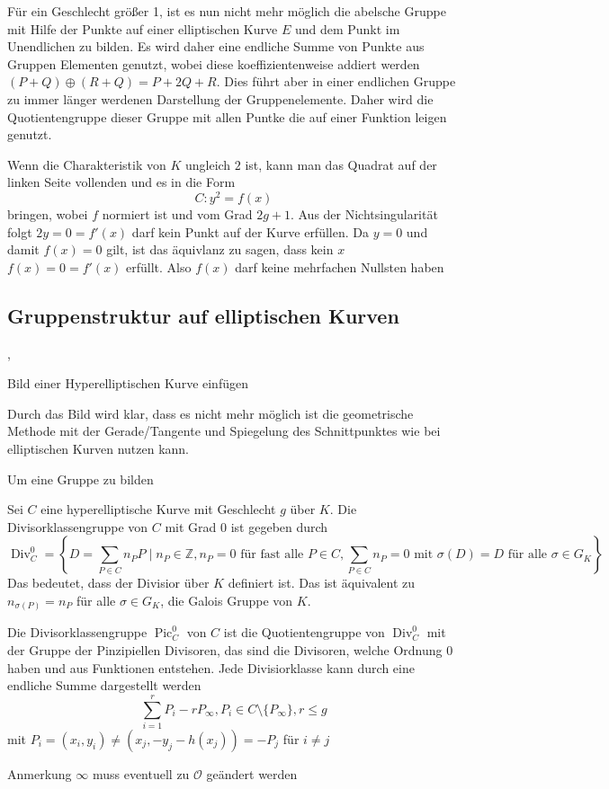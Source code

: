 Für ein Geschlecht größer 1, ist es nun nicht mehr möglich die abelsche Gruppe mit Hilfe der Punkte auf einer elliptischen Kurve $E$ und dem Punkt im Unendlichen zu bilden. Es wird daher eine endliche Summe von Punkte aus Gruppen Elementen genutzt, wobei diese koeffizientenweise addiert werden $(P+Q)\oplus(R+Q)=P +2Q+R$. Dies führt aber in einer endlichen Gruppe zu immer länger werdenen Darstellung der Gruppenelemente. Daher wird die Quotientengruppe dieser Gruppe mit allen Puntke die auf einer Funktion leigen genutzt.

Wenn die Charakteristik von $K$ ungleich $2$ ist, kann man das Quadrat auf der linken Seite vollenden und es in die Form
\[
  C:y^2=f(x)
\]
bringen, wobei $f$ normiert ist und vom Grad $2g+1$. Aus der Nichtsingularität folgt $2y=0=f'(x)$ darf kein Punkt auf der Kurve erfüllen. Da $y=0$ und damit $f(x)=0$ gilt, ist das äquivlanz zu sagen, dass kein $x$ $f(x)=0=f'(x)$ erfüllt. Also $f(x)$ darf keine mehrfachen Nullsten haben
\subsection{Gruppenstruktur auf elliptischen Kurven}
\cite[S.304--305]{Cohen06},


Bild einer Hyperelliptischen Kurve einfügen


Durch das Bild wird klar, dass es nicht mehr möglich ist die geometrische Methode mit der Gerade/Tangente und Spiegelung des Schnittpunktes wie bei elliptischen Kurven nutzen kann.

Um eine Gruppe zu bilden

\begin{definition}[Divisorklassengruppe]
  Sei $C$ eine hyperelliptische Kurve mit Geschlecht $g$ über $K$. Die Divisorklassengruppe von $C$ mit Grad $0$ ist gegeben durch
  \[
    \operatorname{Div}^0_C=\left\{D=\sum_{P\in C}n_P P\mid n_P\in\mathbb{Z},n_P=0 \text{ für fast alle }P\in C, \sum_{P\in C}n_P=0 \text{ mit }\sigma(D)=D \text{ für alle }\sigma\in G_K\right\}
  \]
  Das bedeutet, dass der Divisior über $K$ definiert ist. Das ist äquivalent zu $n_{\sigma(P)}=n_P$ für alle $\sigma\in G_K$, die Galois Gruppe von $K$.
\end{definition}

\begin{definition}
  Die Divisorklassengruppe $\operatorname{Pic}_C^0$ von $C$ ist die Quotientengruppe von $\operatorname{Div}_C^0$ mit der Gruppe der Pinzipiellen Divisoren, das sind die Divisoren, welche Ordnung $0$ haben und aus Funktionen entstehen.
  Jede Divisiorklasse kann durch eine endliche Summe dargestellt werden
  \[
    \sum_{i=1}^r P_i-rP_\infty, P_i\in C\setminus\{P_\infty\}, r\leq g
  \]
  mit $P_i=(x_i,y_i)\neq (x_j,-y_j-h(x_j))=-P_j$ für $i\neq j$
\end{definition}
Anmerkung $\infty$ muss eventuell zu $\mathcal{O}$ geändert werden

